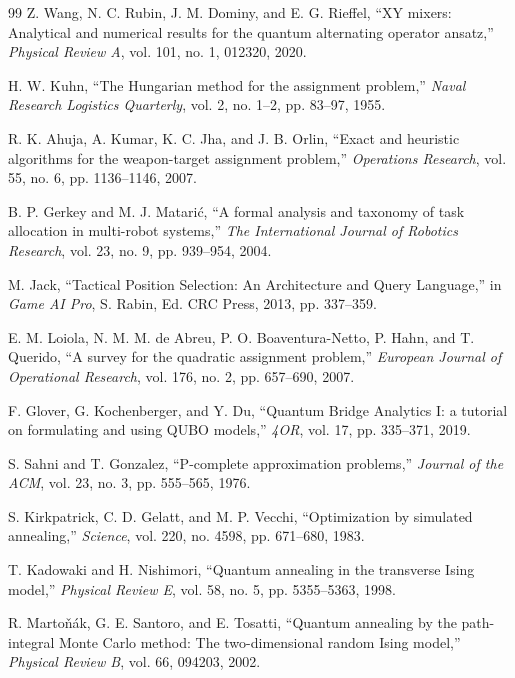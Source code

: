 \documentclass[12pt, a4paper]{article}
\begin{document}
\begin{thebibliography}{99}
Z. Wang, N. C. Rubin, J. M. Dominy, and E. G. Rieffel,
``XY mixers: Analytical and numerical results for the quantum alternating operator ansatz,''
\textit{Physical Review A}, vol. 101, no. 1, 012320, 2020.

H. W. Kuhn,
``The Hungarian method for the assignment problem,''
\textit{Naval Research Logistics Quarterly}, vol. 2, no. 1--2, pp. 83--97, 1955.

R. K. Ahuja, A. Kumar, K. C. Jha, and J. B. Orlin,
``Exact and heuristic algorithms for the weapon-target assignment problem,''
\textit{Operations Research}, vol. 55, no. 6, pp. 1136--1146, 2007.

B. P. Gerkey and M. J. Matari\'c,
``A formal analysis and taxonomy of task allocation in multi-robot systems,''
\textit{The International Journal of Robotics Research}, vol. 23, no. 9, pp. 939--954, 2004.

M. Jack,
``Tactical Position Selection: An Architecture and Query Language,''
in \textit{Game AI Pro}, S. Rabin, Ed. CRC Press, 2013, pp. 337--359.

E. M. Loiola, N. M. M. de Abreu, P. O. Boaventura-Netto, P. Hahn, and T. Querido,
``A survey for the quadratic assignment problem,''
\textit{European Journal of Operational Research}, vol. 176, no. 2, pp. 657--690, 2007.

F. Glover, G. Kochenberger, and Y. Du,
``Quantum Bridge Analytics I: a tutorial on formulating and using QUBO models,''
\textit{4OR}, vol. 17, pp. 335--371, 2019.

S. Sahni and T. Gonzalez,
``P-complete approximation problems,''
\textit{Journal of the ACM}, vol. 23, no. 3, pp. 555--565, 1976.

S. Kirkpatrick, C. D. Gelatt, and M. P. Vecchi,
``Optimization by simulated annealing,''
\textit{Science}, vol. 220, no. 4598, pp. 671--680, 1983.

T. Kadowaki and H. Nishimori,
``Quantum annealing in the transverse Ising model,''
\textit{Physical Review E}, vol. 58, no. 5, pp. 5355--5363, 1998.

R. Marto\v{n}\'{a}k, G. E. Santoro, and E. Tosatti,
``Quantum annealing by the path-integral Monte Carlo method: The two-dimensional random Ising model,''
\textit{Physical Review B}, vol. 66, 094203, 2002.


\end{thebibliography}
\end{document}
